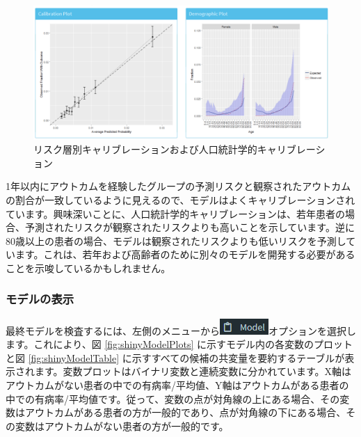 \documentclass[
  11pt]{book}
\theoremstyle{definition}
\theoremstyle{definition}
\theoremstyle{definition}
\theoremstyle{definition}
\theoremstyle{remark}
\begin{document}
\begin{figure}

{\centering \includegraphics[width=1\linewidth]{images/PatientLevelPrediction/shiny/shinyPerformanceCal} 

}

\caption{リスク層別キャリブレーションおよび人口統計学的キャリブレーション}\label{fig:shinyPerformanceCal}
\end{figure}

1年以内にアウトカムを経験したグループの予測リスクと観察されたアウトカムの割合が一致しているように見えるので、モデルはよくキャリブレーションされています。興味深いことに、人口統計学的キャリブレーションは、若年患者の場合、予測されたリスクが観察されたリスクよりも高いことを示しています。逆に80歳以上の患者の場合、モデルは観察されたリスクよりも低いリスクを予測しています。これは、若年および高齢者のために別々のモデルを開発する必要があることを示唆しているかもしれません。

\subsubsection*{モデルの表示}\label{ux30e2ux30c7ux30ebux306eux8868ux793a}

最終モデルを検査するには、左側のメニューから\includegraphics{images/PatientLevelPrediction/modelButton.png}オプションを選択します。これにより、図 \ref{fig:shinyModelPlots} に示すモデル内の各変数のプロットと図 \ref{fig:shinyModelTable} に示すすべての候補の共変量を要約するテーブルが表示されます。変数プロットはバイナリ変数と連続変数に分かれています。X軸はアウトカムがない患者の中での有病率/平均値、Y軸はアウトカムがある患者の中での有病率/平均値です。従って、変数の点が対角線の上にある場合、その変数はアウトカムがある患者の方が一般的であり、点が対角線の下にある場合、その変数はアウトカムがない患者の方が一般的です。
\end{document}
